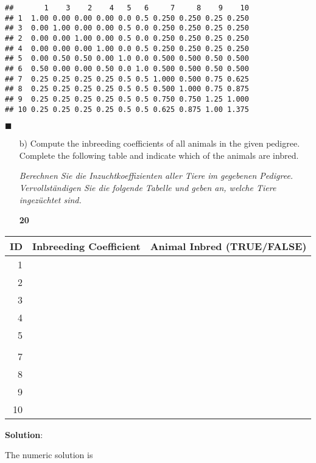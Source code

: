 \documentclass[
]{article}
\newcommand{\points}[1]
{\begin{flushright}\textbf{#1}\end{flushright}}
\newcommand{\solstart}
{\vspace{3ex}\textbf{Solution}:}
\newcommand{\solend}
{\vspace{2ex}$\blacksquare$}
\begin{document}
\begin{verbatim}
##       1    3    2    4   5   6     7     8    9    10
## 1  1.00 0.00 0.00 0.00 0.0 0.5 0.250 0.250 0.25 0.250
## 3  0.00 1.00 0.00 0.00 0.5 0.0 0.250 0.250 0.25 0.250
## 2  0.00 0.00 1.00 0.00 0.5 0.0 0.250 0.250 0.25 0.250
## 4  0.00 0.00 0.00 1.00 0.0 0.5 0.250 0.250 0.25 0.250
## 5  0.00 0.50 0.50 0.00 1.0 0.0 0.500 0.500 0.50 0.500
## 6  0.50 0.00 0.00 0.50 0.0 1.0 0.500 0.500 0.50 0.500
## 7  0.25 0.25 0.25 0.25 0.5 0.5 1.000 0.500 0.75 0.625
## 8  0.25 0.25 0.25 0.25 0.5 0.5 0.500 1.000 0.75 0.875
## 9  0.25 0.25 0.25 0.25 0.5 0.5 0.750 0.750 1.25 1.000
## 10 0.25 0.25 0.25 0.25 0.5 0.5 0.625 0.875 1.00 1.375
\end{verbatim}

\solend

\clearpage
\pagebreak

\begin{enumerate}
\item[b)] Compute the inbreeding coefficients of all animals in the given pedigree. Complete the following table and indicate which of the animals are inbred.

\textit{Berechnen Sie die Inzuchtkoeffizienten aller Tiere im gegebenen Pedigree. Vervollständigen Sie die folgende Tabelle und geben an, welche Tiere ingezüchtet sind.}
\points{20}
\end{enumerate}

\vspace{3ex}

\begin{tabular}{rll}
\toprule
ID & Inbreeding Coefficient & Animal Inbred (TRUE/FALSE)\\
\midrule
1 &  & \\
2 &  & \\
3 &  & \\
4 &  & \\
5 &  & \\
\addlinespace
6 &  & \\
7 &  & \\
8 &  & \\
9 &  & \\
10 &  & \\
\bottomrule
\end{tabular}

\solstart

\vspace{5ex}

The numeric solution is
\end{document}
